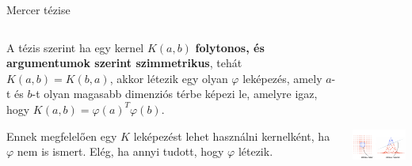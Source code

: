 \documentclass[english, aspectratio=169]{beamer}
\begin{document}
\begin{frame}{Mercer tézise}
\begin{columns}
\begin{column}{.5\textwidth}
A tézis szerint ha egy kernel $K\left( a,b \right)$ \textbf{folytonos, és argumentumok szerint szimmetrikus}, tehát $K\left( a,b \right) = K\left( b,a \right)$, akkor létezik egy olyan $\varphi$ leképezés, amely $a$-t és $b$-t olyan magasabb dimenziós térbe képezi le,  amelyre igaz, hogy $K\left( a,b \right) = \varphi \left( a \right)^T \varphi \left( b \right)$.\par\medskip
Ennek megfelelően egy $K$ leképezést lehet használni kernelként, ha $\varphi$ nem is ismert. Elég, ha annyi tudott, hogy $\varphi$ létezik.
\end{column}
\begin{column}{.5\textwidth}
\begin{center}
\includegraphics[width=7cm, height=7cm, keepaspectratio]{images/svm_30.png}
\end{center}
\end{column}
\end{columns}
\end{frame}
\end{document}
